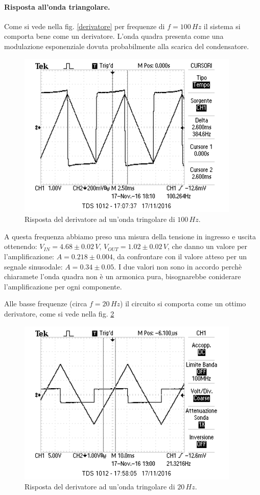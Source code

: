 \documentclass[10pt,a4paper]{article}
\begin{document}
\paragraph{Risposta all'onda triangolare.} Come si vede nella fig. \ref{derivatore} per frequenze di $f = 100\,Hz$ il sistema si comporta bene come un derivatore. L'onda quadra presenta come una modulazione esponenziale dovuta probabilmente alla scarica del condensatore.

\begin{figure}[!htb]
\centering
   \includegraphics[scale=1.0]{immagini/derivatore.png}
\caption{Risposta del derivatore ad un'onda tringolare di $100\,Hz$.}
\label{derivatore100}
\end{figure}

A questa frequenza abbiamo preso una misura della tensione in ingresso e uscita ottenendo: $V_{IN} = 4.68 \pm 0.02 \, V$, $V_{OUT} = 1.02 \pm 0.02 \, V$, che danno un valore per l'amplificazione: $A = 0.218 \pm 0.004$, da confrontare con il valore atteso per un segnale sinusodale: $A = 0.34 \pm 0.05$. I due valori non sono in accordo perchè chiaramete l'onda quadra non è un armonica pura, bisognarebbe coniderare l'amplificazione per ogni componente.

Alle basse frequenze (circa $f = 20 \, Hz$) il circuito si comporta come un ottimo derivatore, come si vede nella fig. \ref{ottimoDerivatore}

\begin{figure}[!htb]
\centering
   \includegraphics[scale=1.0]{immagini/bassafreqderivatore.png}
\caption{Risposta del derivatore ad un'onda tringolare di $20\,Hz$.}
\label{ottimoDerivatore}
\end{figure}
\end{document}
